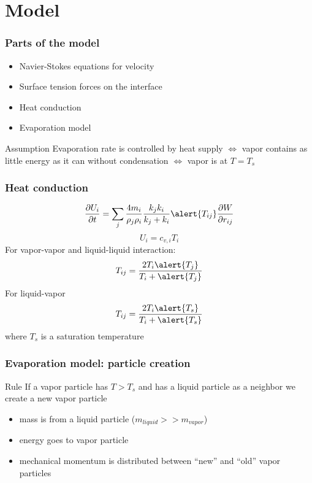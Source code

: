 \documentclass{beamer}
\begin{document}
\section[Model]{Model}
\begin{frame}
  \frametitle{Parts of the model}
  \begin{itemize}
  \item Navier-Stokes equations for velocity
  \item Surface tension forces on the interface~\footnotemark
  \item \alert{Heat conduction~\footnotemark[2]}
  \item \alert{Evaporation model}
  \end{itemize}
  \begin{block}{Assumption}
    Evaporation rate is controlled by heat supply
    $\Longleftrightarrow$ vapor contains as little energy as it can
    without condensation $\Longleftrightarrow$ vapor is at $T=T_s$
  \end{block}

\end{frame}

\begin{frame}
  \frametitle{Heat conduction}
  \begin{equation}
    \label{eq:heatConductionTerm}
    \frac{\partial U_i}{\partial t} = \sum_j\frac{4 m_i}{\rho_j \rho_i} \frac{k_j k_i}{k_j + k_i} \alert{T_{ij}} \frac{\partial W}{\partial r_{ij}}
  \end{equation}
  \begin{equation}
    \label{eq:ideal}
    U_i = c_{v,i} T_i
  \end{equation}
  For vapor-vapor and liquid-liquid interaction:
  \begin{equation}
    \label{eq:tij}
    T_{ij} = \frac{2T_i \alert{T_j}}{T_i + \alert{T_j}}
  \end{equation}
  For liquid-vapor
  \begin{equation}
    \label{eq:tab}
    T_{ij} = \frac{2T_i \alert{T_s}}{T_i + \alert{T_s}}
  \end{equation}
  where $T_s$ is a saturation temperature
\end{frame}

\begin{frame}
  \frametitle{Evaporation model: particle creation}
  \begin{block}{Rule}
    If a vapor particle has $T>T_s$ and has a liquid particle as a
    neighbor we create a new vapor particle
  \end{block}
  \begin{itemize}
  \item mass is from a liquid particle ($m_{liquid} >> m_{vapor}$)
  \item energy goes to vapor particle
  \item mechanical momentum is distributed between ``new'' and ``old''
    vapor particles
  \end{itemize}
\end{frame}
\end{document}
